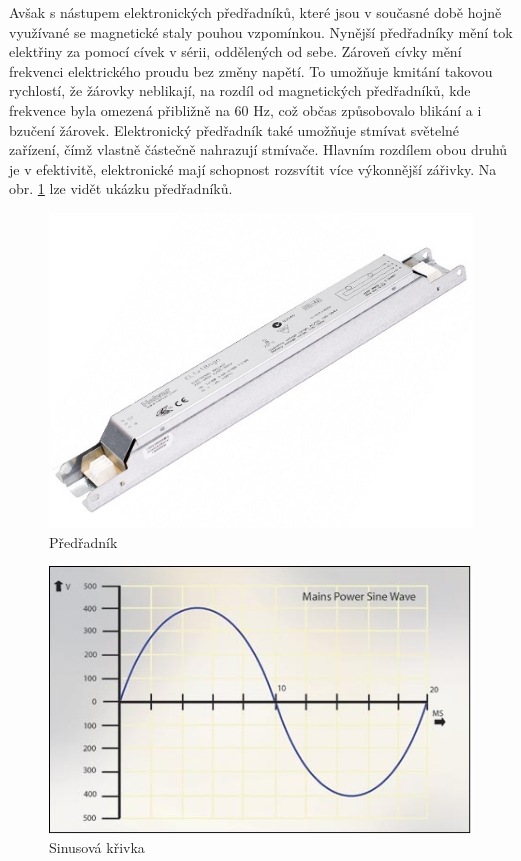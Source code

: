 \documentclass[FM,RP]{tulthesis}
\begin{document}
  Avšak s nástupem elektronických předřadníků, které jsou v současné době hojně využívané se magnetické staly pouhou vzpomínkou. Nynější předřadníky mění tok elektřiny za pomocí cívek v sérii, oddělených od sebe. 
  Zároveň cívky mění frekvenci elektrického proudu bez změny napětí. To umožňuje kmitání takovou rychlostí, že žárovky neblikají, na rozdíl od magnetických předřadníků, kde frekvence byla omezená přibližně na 60 Hz, což občas způsobovalo blikání a i bzučení žárovek. Elektronický předřadník také umožňuje stmívat světelné zařízení, čímž vlastně částečně nahrazují stmívače. Hlavním rozdílem obou druhů je v efektivitě, elektronické mají schopnost rozsvítit více výkonnější zářivky. Na obr. \ref{predradnik}  lze vidět ukázku předřadníků.
  
   \begin{figure}[h]
  	\begin{center}
  		\includegraphics[scale=0.5]{predradnik.jpg}
  		\caption{Předřadník}
  		\label{predradnik}
  	\end{center}
  \end{figure}
  
  
  \begin{figure}[h]
  	\begin{center}
  		\includegraphics[scale=0.92]{waveform.jpg}
  		\caption{Sinusová křivka}
  		\label{sinusovakrivka}
  	\end{center}
  \end{figure}
  
\end{document}
